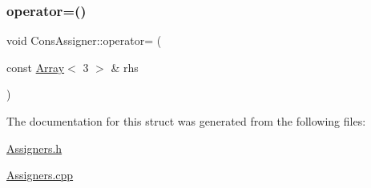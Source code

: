 \subsubsection{\texorpdfstring{operator=()}{operator=()}}
{\footnotesize\ttfamily void Cons\+Assigner\+::operator= (\begin{DoxyParamCaption}\item[{const \hyperlink{Includes_8h_abd9de33944f934950000c3929e14ad8d}{Array}$<$ 3 $>$ \&}]{rhs }\end{DoxyParamCaption})}



The documentation for this struct was generated from the following files\+:\begin{DoxyCompactItemize}
\item 
\hyperlink{Assigners_8h}{Assigners.\+h}\item 
\hyperlink{Assigners_8cpp}{Assigners.\+cpp}\end{DoxyCompactItemize}
